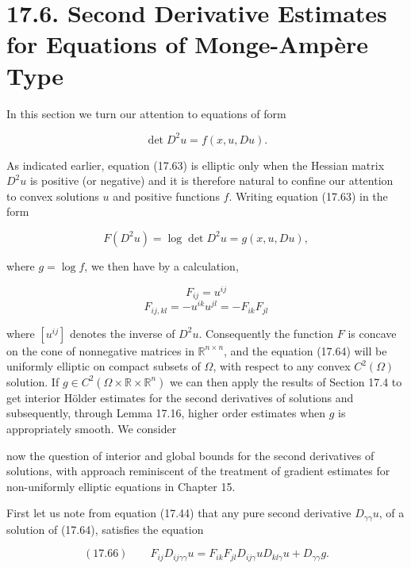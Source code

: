 \section*{17.6. Second Derivative Estimates for Equations of Monge-Amp\`ere Type}

In this section we turn our attention to equations of form

\begin{equation}
\det D^2u = f(x,u,Du).
\tag{17.63}
\end{equation}

As indicated earlier, equation (17.63) is elliptic only when the Hessian matrix $D^2u$
is positive (or negative) and it is therefore natural to confine our attention to
convex solutions $u$ and positive functions $f$. Writing equation (17.63) in the form

\begin{equation}
F(D^2u)=\log \det D^2u = g(x,u,Du),
\tag{17.64}
\end{equation}

where $g=\log f$, we then have by a calculation,

\begin{equation}
F_{ij}=u^{ij}
\tag{17.65}
\end{equation}
\[
F_{ij,kl}=-u^{ik}u^{jl}=-F_{ik}F_{jl}
\]

where $[u^{ij}]$ denotes the inverse of $D^2u$. Consequently the function $F$ is concave on
the cone of nonnegative matrices in $\mathbb{R}^{n\times n}$, and the equation (17.64) will be uniformly
elliptic on compact subsets of $\Omega$, with respect to any convex $C^2(\Omega)$ solution. If
$g\in C^2(\Omega\times\mathbb{R}\times\mathbb{R}^n)$ we can then apply the results of Section 17.4 to get interior
H\"older estimates for the second derivatives of solutions and subsequently, through
Lemma 17.16, higher order estimates when $g$ is appropriately smooth. We consider



now the question of interior and global bounds for the second derivatives of solutions, with approach reminiscent of the treatment of gradient estimates for non-uniformly elliptic equations in Chapter 15.

First let us note from equation (17.44) that any pure second derivative $D_{\gamma\gamma}u$, of a solution of (17.64), satisfies the equation

\begin{equation}
(17.66)\qquad F_{ij}D_{ij\gamma\gamma}u = F_{ik}F_{jl}D_{ij\gamma}uD_{kl\gamma}u + D_{\gamma\gamma}g.
\end{equation}

